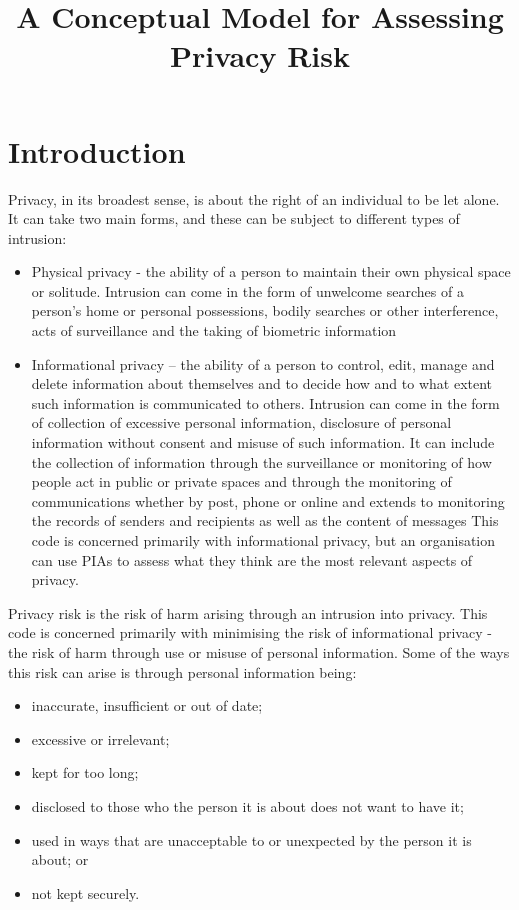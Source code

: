\documentclass{article}
\begin{document}
\title{A Conceptual Model for Assessing Privacy Risk}
\maketitle
\section{Introduction}
Privacy, in its broadest sense, is about the right of an individual to be let alone. It can take two main forms, and these can be subject to different types of intrusion: 
\begin{itemize}
\item Physical privacy - the ability of a person to maintain their own physical space or solitude. Intrusion can come in the form of unwelcome searches of a person’s home or personal possessions, bodily searches or other interference, acts of surveillance and the taking of biometric information 
\item Informational privacy – the ability of a person to control, edit, manage and delete information about themselves and to decide how and to what extent such information is communicated to others. Intrusion can come in the form of collection of excessive personal information, disclosure of personal information without consent and misuse of such information. It can include the collection of information through the surveillance or monitoring of how people act in public or private spaces and through the monitoring of communications whether by post, phone or online and extends to monitoring the records of senders and recipients as well as the content of messages This code is concerned primarily with informational privacy, but an organisation can use PIAs to assess what they think are the most relevant aspects of privacy.
\end{itemize}
Privacy risk is the risk of harm arising through an intrusion into privacy. This code is concerned primarily with minimising the risk of informational privacy - the risk of harm through use or misuse of personal information. Some of the ways this risk can arise is through personal information being: 
\begin{itemize}
\item inaccurate, insufficient or out of date; 
\item excessive or irrelevant; 
\item  kept for too long;
\item disclosed to those who the person it is about does not want to have it;
\item used in ways that are unacceptable to or unexpected by the person it is about; or 
\item not kept securely. 
\end{itemize}
\end{document}
